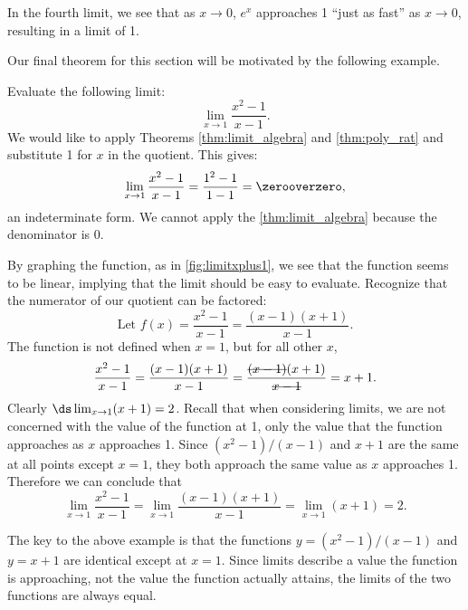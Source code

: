 In the fourth limit, we see that as $x\to 0$, $e^x$ approaches 1 ``just as fast'' as $x\to 0$, resulting in a limit of 1.

Our final theorem for this section will be motivated by the following example.

\begin{example}\label{ex_limit_onept}
Evaluate the following limit:
\[\lim_{x\to 1}\frac{x^2-1}{x-1}.\]
%
\solution
We would like to apply Theorems \ref{thm:limit_algebra} and \ref{thm:poly_rat} and substitute 1 for $x$ in the quotient. This gives:
\[\lim_{x\to 1}\frac{x^2-1}{x-1} = \frac{1^2-1}{1-1} = \zerooverzero,\]
an indeterminate form. We cannot apply the \autoref{thm:limit_algebra} because the denominator is 0.

By graphing the function, as in \autoref{fig:limitxplus1}, we see that the function seems to be linear, implying that the limit should be easy to evaluate. Recognize that the numerator of our quotient can be factored:
\[\text{Let \ } f(x)=\frac{x^2-1}{x-1} = \frac{(x-1)(x+1)}{x-1}.\]
The function is not defined when $x=1$, but for all other $x$,
\[\frac{x^2-1}{x-1} = \frac{(x-1)(x+1)}{x-1} = \frac{\hbox{\sout{$(x-1)$}}(x+1)}{\hbox{\sout{$x-1$}}}= x+1.\]
Clearly $\ds\lim_{x\to 1}(x+1)=2$. Recall that when considering limits, we are not concerned with the value of the function at 1, only the value that the function approaches as $x$ approaches 1. Since $(x^2-1)/(x-1)$ and $x+1$ are the same at all points except $x=1$, they both approach the same value as $x$ approaches 1. Therefore we can conclude that
\[\lim_{x\to 1}\frac{x^2-1}{x-1}=\lim_{x\to 1}\frac{(x-1)(x+1)}{x-1}=\lim_{x\to 1} (x+1)=2.\]
\end{example}

The key to the above example is that the functions $y=(x^2-1)/(x-1)$ and $y=x+1$ are identical except at $x=1$. Since limits describe a value the function is approaching, not the value the function actually attains, the limits of the two functions are always equal.

